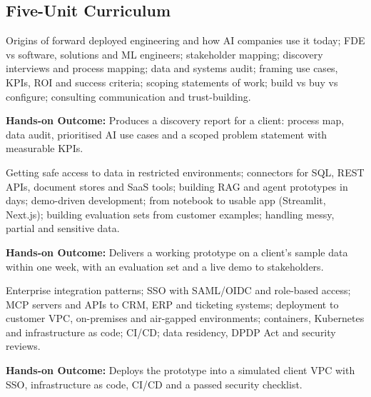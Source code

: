 \documentclass[10pt,a4paper]{article}
\begin{document}
\subsection*{Five-Unit Curriculum}
\begin{tcolorbox}[unitbox,title={{\color{gold}UNIT I}\quad The FDE Model and Customer Discovery\hfill{\color{gold}9 Hours}}]\small Origins of forward deployed engineering and how AI companies use it today; FDE vs software, solutions and ML engineers; stakeholder mapping; discovery interviews and process mapping; data and systems audit; framing use cases, KPIs, ROI and success criteria; scoping statements of work; build vs buy vs configure; consulting communication and trust-building.\par\vspace{2pt}\par\textbf{Hands-on Outcome:} Produces a discovery report for a client: process map, data audit, prioritised AI use cases and a scoped problem statement with measurable KPIs.\end{tcolorbox}
\begin{tcolorbox}[unitbox,title={{\color{gold}UNIT II}\quad Rapid Prototyping on Customer Data\hfill{\color{gold}9 Hours}}]\small Getting safe access to data in restricted environments; connectors for SQL, REST APIs, document stores and SaaS tools; building RAG and agent prototypes in days; demo-driven development; from notebook to usable app (Streamlit, Next.js); building evaluation sets from customer examples; handling messy, partial and sensitive data.\par\vspace{2pt}\par\textbf{Hands-on Outcome:} Delivers a working prototype on a client's sample data within one week, with an evaluation set and a live demo to stakeholders.\end{tcolorbox}
\begin{tcolorbox}[unitbox,title={{\color{gold}UNIT III}\quad Integration and Deployment in Customer Environments\hfill{\color{gold}9 Hours}}]\small Enterprise integration patterns; SSO with SAML/OIDC and role-based access; MCP servers and APIs to CRM, ERP and ticketing systems; deployment to customer VPC, on-premises and air-gapped environments; containers, Kubernetes and infrastructure as code; CI/CD; data residency, DPDP Act and security reviews.\par\vspace{2pt}\par\textbf{Hands-on Outcome:} Deploys the prototype into a simulated client VPC with SSO, infrastructure as code, CI/CD and a passed security checklist.\end{tcolorbox}
\end{document}
